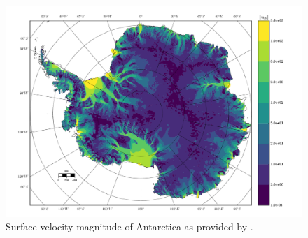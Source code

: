 
\begin{figure}
  \centering
    \includegraphics[width=\linewidth]{images/balance_velocity/antarctica/U_ob.pdf}
  \caption[Antarctica surface velocity magnitude]{Surface velocity magnitude of Antarctica as provided by \citet{rignot_2011a, rignot_2011}.}
  \label{antarctica_u_ob_image}
\end{figure}


